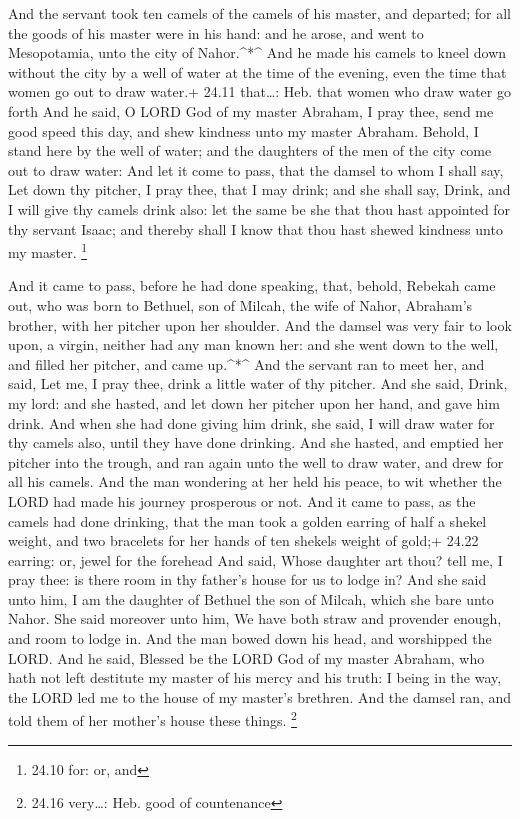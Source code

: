  And the servant took ten camels of the camels of his
master, and departed; for all the goods of his master were in his hand:
and he arose, and went to Mesopotamia, unto the city of Nahor.\^{}*\^{}
 And he made his camels to kneel down without the city by a
well of water at the time of the evening, even the time that women go
out to draw water.+ 24.11 that\ldots: Heb. that women who draw water go
forth  And he said, O LORD God of my master Abraham, I pray
thee, send me good speed this day, and shew kindness unto my master
Abraham.  Behold, I stand here by the well of water; and
the daughters of the men of the city come out to draw water:
 And let it come to pass, that the damsel to whom I shall
say, Let down thy pitcher, I pray thee, that I may drink; and she shall
say, Drink, and I will give thy camels drink also: let the same be she
that thou hast appointed for thy servant Isaac; and thereby shall I know
that thou hast shewed kindness unto my master. \footnote{24.10 for: or,
  and}

 And it came to pass, before he had done speaking, that,
behold, Rebekah came out, who was born to Bethuel, son of Milcah, the
wife of Nahor, Abraham's brother, with her pitcher upon her shoulder.
 And the damsel was very fair to look upon, a virgin,
neither had any man known her: and she went down to the well, and filled
her pitcher, and came up.\^{}*\^{}  And the servant ran to
meet her, and said, Let me, I pray thee, drink a little water of thy
pitcher.  And she said, Drink, my lord: and she hasted, and
let down her pitcher upon her hand, and gave him drink. 
And when she had done giving him drink, she said, I will draw water for
thy camels also, until they have done drinking.  And she
hasted, and emptied her pitcher into the trough, and ran again unto the
well to draw water, and drew for all his camels.  And the
man wondering at her held his peace, to wit whether the LORD had made
his journey prosperous or not.  And it came to pass, as the
camels had done drinking, that the man took a golden earring of half a
shekel weight, and two bracelets for her hands of ten shekels weight of
gold;+ 24.22 earring: or, jewel for the forehead  And said,
Whose daughter art thou? tell me, I pray thee: is there room in thy
father's house for us to lodge in?  And she said unto him,
I am the daughter of Bethuel the son of Milcah, which she bare unto
Nahor.  She said moreover unto him, We have both straw and
provender enough, and room to lodge in.  And the man bowed
down his head, and worshipped the LORD.  And he said,
Blessed be the LORD God of my master Abraham, who hath not left
destitute my master of his mercy and his truth: I being in the way, the
LORD led me to the house of my master's brethren.  And the
damsel ran, and told them of her mother's house these things.
\footnote{24.16 very\ldots: Heb. good of countenance}

